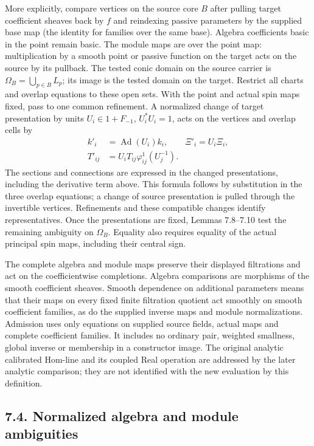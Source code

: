 \documentclass[
  english,
  11pt,
  reqno]{amsart}
\makeatletter
\newcommand{\paperdisplaynext}{%
  \let\paper@savedstartsection\@startsection
  \def\@startsection##1##2##3##4##5##6{%
    \let\@startsection\paper@savedstartsection
    \@tempskipa ##5\relax
    \ifdim\@tempskipa<\z@
      \def\paper@afterskip{.35\baselineskip}%
    \else
      \def\paper@afterskip{##5}%
    \fi
    \@startsection{##1}{##2}{##3}{##4}{\paper@afterskip}{##6}}}
\newcommand{\paperdisplaysection}{\paperdisplaynext\subsection}
\let\paper@displaysection\paperdisplaysection
\renewcommand{\paperdisplaysection}[1]{%
  \let\paper@savedhangfrom\@hangfrom
  \long\def\@hangfrom##1##2{%
    \paper@savedhangfrom{##1}{\paper@headingparagraph##2}}%
  \paper@displaysection{#1}%
  \let\@hangfrom\paper@savedhangfrom}
\makeatother
\begin{document}
More explicitly, compare vertices on the source core \(B\) after pulling
target coefficient sheaves back by \(f\) and reindexing passive
parameters by the supplied base map (the identity for families over the
same base). Algebra coefficients basic in the point remain basic. The
module maps are over the point map: multiplication by a smooth point or
passive function on the target acts on the source by its pullback. The
tested conic domain on the source carrier is
\(\Omega_B=\bigcup_{p\in B}L_p\); its image is the tested domain on the
target. Restrict all charts and overlap equations to these open sets.
With the point and actual spin maps fixed, pass to one common
refinement. A normalized change of target presentation by units
\(U_i\in 1+F_{-1}\), \(U_i^*U_i=1\), acts on the vertices and overlap
cells by \[
\begin{aligned}
k'_i&=\operatorname{Ad}(U_i) k_i,\qquad \Xi'_i=U_i\Xi_i,\\
T'_{ij}&=U_iT_{ij}\varphi^1_{ij}(U_j^{-1}).
\end{aligned}
\] The sections and connections are expressed in the changed
presentations, including the derivative term above. This formula follows
by substitution in the three overlap equations; a change of source
presentation is pulled through the invertible vertices. Refinements and
these compatible changes identify representatives. Once the
presentations are fixed, Lemmas 7.8--7.10 test the remaining ambiguity
on \(\Omega_B\). Equality also requires equality of the actual principal
spin maps, including their central sign.

The complete algebra and module maps preserve their displayed
filtrations and act on the coefficientwise completions. Algebra
comparisons are morphisms of the smooth coefficient sheaves. Smooth
dependence on additional parameters means that their maps on every fixed
finite filtration quotient act smoothly on smooth coefficient families,
as do the supplied inverse maps and module normalizations. Admission
uses only equations on supplied source fields, actual maps and complete
coefficient families. It includes no ordinary pair, weighted smallness,
global inverse or membership in a constructor image. The original
analytic calibrated Hom-line and its coupled Real operation are
addressed by the later analytic comparison; they are not identified with
the new evaluation by this definition.

\paperdisplaysection{7.4. Normalized algebra and module
ambiguities}\label{normalized-algebra-and-module-ambiguities}\label{sec:online-normalized-comparison-rigidity}
\end{document}
